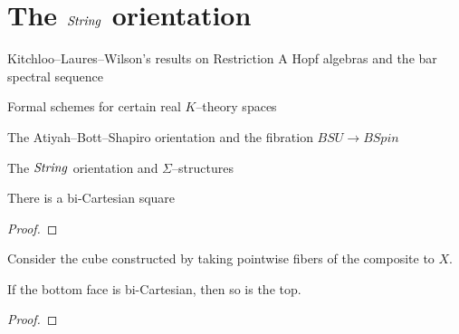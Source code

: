 





\section{The $\mathit{String}$ orientation}

Kitchloo--Laures--Wilson's results on Restriction A Hopf algebras and the bar spectral sequence

Formal schemes for certain real $K$--theory spaces

The Atiyah--Bott--Shapiro orientation and the fibration $BSU \to BSpin$ 

The $\mathit{String}$ orientation and $\Sigma$--structures



\begin{theorem}
There is a bi-Cartesian square
\begin{center}
\end{center}
\end{theorem}
\begin{proof}
\end{proof}

\begin{lemma}
Consider the cube constructed by taking pointwise fibers of the composite to $X$.
\begin{center}
\end{center}
If the bottom face is bi-Cartesian, then so is the top.
\end{lemma}
\begin{proof}
\end{proof}

